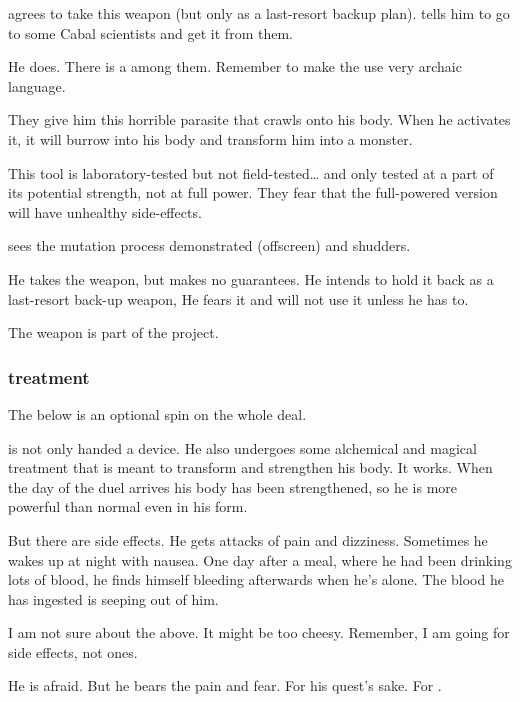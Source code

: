 \Teshrial{} agrees to take this weapon (but only as a last-resort backup plan). 
\Azraid{} tells him to go to some Cabal scientists and get it from them. 

He does. 
There is a \banelord{} among them. 
Remember to make the \banelord{} use very archaic language. 

They give him this horrible parasite that crawls onto his body. 
When he activates it, it will burrow into his body and transform him into a monster. 

This tool is laboratory-tested but not field-tested\ldots{} and only tested at a part of its potential strength, not at full power. 
They fear that the full-powered version will have unhealthy side-effects. 

\Teshrial{} sees the mutation process demonstrated (offscreen) and shudders. 

He takes the weapon, but makes no guarantees. 
He intends to hold it back as a last-resort back-up weapon, 
He fears it and will not use it unless he has to. 

The weapon is part of the  project. 





\subsubsection{\NeoResphan{} treatment}
The below is an optional spin on the whole  deal. 

\Teshrial{} is not only handed a device. 
He also undergoes some alchemical and magical treatment that is meant to transform and strengthen his body. 
It works. 
When the day of the duel arrives his body has been strengthened, so he is more powerful than normal even in his \resphan{} form. 

But there are side effects. 
He gets attacks of pain and dizziness. 
Sometimes he wakes up at night with nausea. 
One day after a meal, where he had been drinking lots of blood, he finds himself bleeding afterwards when he's alone. 
The blood he has ingested is seeping out of him. 

I am not sure about the above. 
It might be too cheesy. 
Remember, I am going for  side effects, not  ones. 

He is afraid. 
But he bears the pain and fear. 
For his quest's sake. 
For \Firaxel. 





